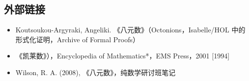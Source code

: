 \subsection{外部链接}
\begin{itemize}
\item Koutsoukou-Argyraki, Angeliki. 《八元数》（Octonions，Isabelle/HOL 中的形式化证明，Archive of Formal Proofs）
\item 《凯莱数》），Encyclopedia of Mathematics*，EMS Press，2001 [1994]
\item Wilson, R. A. (2008), 《八元数》，纯数学研讨班笔记 
\end{itemize}

